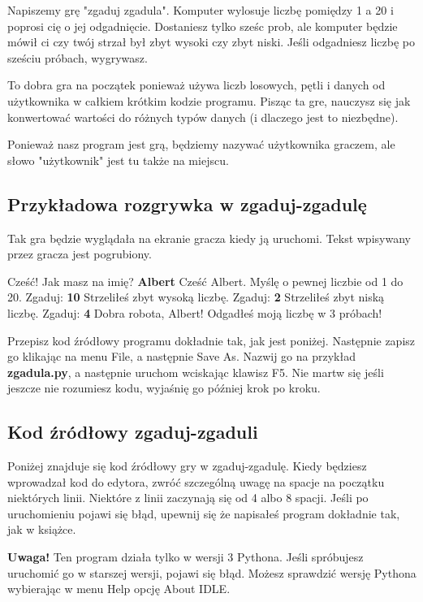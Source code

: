 \documentclass{book}
\begin{document}
Napiszemy grę "zgaduj zgadula". Komputer wylosuje liczbę pomiędzy 1 a 20 i poprosi cię o jej odgadnięcie. Dostaniesz tylko sześc prob, ale komputer będzie mówił ci czy twój strzał był zbyt wysoki czy zbyt niski. Jeśli odgadniesz liczbę po sześciu próbach, wygrywasz.

To dobra gra na początek ponieważ używa liczb losowych, pętli i danych od użytkownika w całkiem krótkim kodzie programu. Pisząc ta gre, nauczysz się jak konwertować wartości do różnych typów danych (i dlaczego jest to niezbędne).

Ponieważ nasz program jest grą, będziemy nazywać użytkownika graczem, ale słowo "użytkownik" jest tu także na miejscu.

\subsection{Przykładowa rozgrywka w zgaduj-zgadulę}

Tak gra będzie wyglądała na ekranie gracza kiedy ją uruchomi. Tekst wpisywany przez gracza jest pogrubiony.

Cześć! Jak masz na imię?
{\bf Albert}
Cześć Albert. Myślę o pewnej liczbie od 1 do 20.
Zgaduj:
{\bf 10}
Strzeliłeś zbyt wysoką liczbę.
Zgaduj:
{\bf 2}
Strzeliłeś zbyt niską liczbę.
Zgaduj:
{\bf 4}
Dobra robota, Albert! Odgadłeś moją liczbę w 3 próbach!

Przepisz kod źródłowy programu dokładnie tak, jak jest poniżej. Następnie zapisz go klikając na menu File, a następnie Save As. Nazwij go na przykład {\bf zgadula.py}, a następnie uruchom wciskając klawisz F5. Nie martw się jeśli jeszcze nie rozumiesz kodu, wyjaśnię go później krok po kroku.

\subsection{Kod źródłowy zgaduj-zgaduli}

Poniżej znajduje się kod źródłowy gry w zgaduj-zgadulę. Kiedy będziesz wprowadzał kod do edytora, zwróć szczególną uwagę na spacje na początku niektórych linii. Niektóre z linii zaczynają się od 4 albo 8 spacji. Jeśli po uruchomieniu pojawi się błąd, upewnij się że napisałeś program dokładnie tak, jak w książce.


{\bf Uwaga!} Ten program działa tylko w wersji 3 Pythona. Jeśli spróbujesz uruchomić go w starszej wersji, pojawi się błąd. Możesz sprawdzić wersję Pythona wybierając w menu Help opcję About IDLE.
\end{document}
